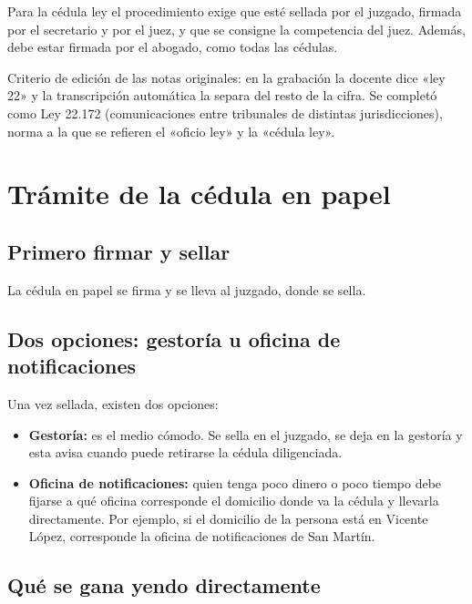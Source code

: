 \documentclass[12pt,oneside]{book}
\begin{document}
Para la cédula ley el procedimiento exige que esté sellada por el juzgado, firmada por el secretario y por el juez, y que se consigne la competencia del juez. Además, debe estar firmada por el abogado, como todas las cédulas.

\begin{note}
Criterio de edición de las notas originales: en la grabación la docente dice «ley 22» y la transcripción automática la separa del resto de la cifra. Se completó como Ley 22.172 (comunicaciones entre tribunales de distintas jurisdicciones), norma a la que se refieren el «oficio ley» y la «cédula ley».
\end{note}

\section{Trámite de la cédula en papel}

\subsection{Primero firmar y sellar}

La cédula en papel se firma y se lleva al juzgado, donde se sella.

\subsection{Dos opciones: gestoría u oficina de notificaciones}

Una vez sellada, existen dos opciones:

\begin{itemize}
    \item \textbf{Gestoría:} es el medio cómodo. Se sella en el juzgado, se deja en la gestoría y esta avisa cuando puede retirarse la cédula diligenciada.
    \item \textbf{Oficina de notificaciones:} quien tenga poco dinero o poco tiempo debe fijarse a qué oficina corresponde el domicilio donde va la cédula y llevarla directamente. Por ejemplo, si el domicilio de la persona está en Vicente López, corresponde la oficina de notificaciones de San Martín.
\end{itemize}

\subsection{Qué se gana yendo directamente}
\end{document}
